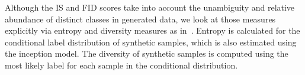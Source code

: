\documentclass[conference]{IEEEtran}
\begin{document}

Although the IS and FID scores take into account the unambiguity and relative abundance of distinct classes in generated data, we look at those measures explicitly via entropy and diversity measures as in~\cite{PrivGAN2019}. Entropy is calculated for the conditional label distribution of synthetic samples, which is also estimated using the inception model. The diversity of synthetic samples is computed using the most likely label for each sample in the conditional distribution. 

\end{document}
